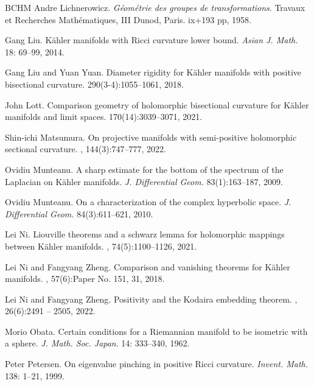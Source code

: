 \documentclass[12pt, reqno]{amsart}
\theoremstyle{plain}
\theoremstyle{definition}
\renewcommand{\>}{\rightarrow}
\renewcommand{\#}{\sharp}
\numberwithin{equation}{section} %
\begin{document}
\begin{thebibliography}{BCHM}
 Andre Lichnerowicz. {\em G\'{e}om\'{e}trie des groupes de transformations}. Travaux et Recherches Math\'{e}matiques, III Dunod, Paris. ix+193 pp, 1958.



 Gang  Liu.  K\"ahler manifolds with Ricci curvature lower bound. \emph{Asian J. Math.} 18: 69--99,  2014.

Gang Liu and Yuan Yuan.
\newblock Diameter rigidity for {K}\"ahler manifolds with positive bisectional curvature.
  290(3-4):1055--1061, 2018.

John Lott.
\newblock Comparison geometry of holomorphic bisectional curvature for {K}\"ahler manifolds and limit spaces.
 170(14):3039--3071, 2021.


Shin-ichi Matsumura.
\newblock On projective manifolds with semi-positive holomorphic sectional curvature.
, 144(3):747--777, 2022.


 Ovidiu Munteanu. A sharp estimate for the bottom of the spectrum of the Laplacian on K\"ahler manifolds. \emph{J. Differential Geom.} 83(1):163--187, 2009.

 Ovidiu Munteanu. On a characterization of the complex hyperbolic space. \emph{J. Differential Geom.} 84(3):611--621, 2010.

Lei Ni.
\newblock Liouville theorems and a schwarz lemma for holomorphic mappings between {K}\"ahler manifolds.
, 74(5):1100--1126, 2021.

Lei Ni and Fangyang Zheng.
\newblock Comparison and vanishing theorems for {K}\"ahler manifolds.
, 57(6):Paper No. 151, 31, 2018.

Lei Ni and Fangyang Zheng.
\newblock Positivity and the {K}odaira embedding theorem.
, 26(6):2491 -- 2505, 2022.


 Morio Obata.  Certain conditions for a Riemannian manifold to be isometric with a sphere. \emph{J. Math. Soc. Japan}. 14: 333--340, 1962.

 Peter  Petersen. On eigenvalue pinching in positive Ricci curvature.  \emph{Invent. Math.} 138: 1--21, 1999.



\end{thebibliography}
\end{document}
